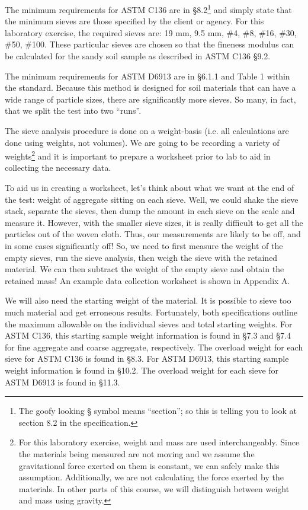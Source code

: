 \documentclass[12pt]{article}
\begin{document}
The minimum requirements for ASTM C136 are in \S8.2\footnote{The goofy looking \S{} symbol means ``section''; so this is telling you to look at section 8.2 in the specification.} and simply state that the minimum sieves are those specified by the client or agency. For this laboratory exercise, the required sieves are: 19 mm, 9.5 mm, \#4, \#8, \#16, \#30, \#50, \#100. These particular sieves are chosen so that the fineness modulus can be calculated for the sandy soil sample as described in ASTM C136 \S9.2.

The minimum requirements for ASTM D6913 are in \S6.1.1 and Table 1 within the standard. Because this method is designed for soil materials that can have a wide range of particle sizes, there are significantly more sieves. So many, in fact, that we split the test into two ``runs''.

The sieve analysis procedure is done on a weight-basis (i.e. all calculations are done using weights, not volumes). We are going to be recording a variety of weights\footnote{For this laboratory exercise, weight and mass are used interchangeably. Since the materials being measured are not moving and we assume the gravitational force exerted on them is constant, we can safely make this assumption. Additionally, we are not calculating the force exerted by the materials. In other parts of this course, we will distinguish between weight and mass using gravity.} and it is important to prepare a worksheet prior to lab to aid in collecting the necessary data.

To aid us in creating a worksheet, let's think about what we want at the end of the test: weight of aggregate sitting on each sieve. Well, we could shake the sieve stack, separate the sieves, then dump the amount in each sieve on the scale and measure it. However, with the smaller sieve sizes, it is really difficult to get all the particles out of the woven cloth. Thus, our measurements are likely to be off, and in some cases significantly off! So, we need to first measure the weight of the empty sieves, run the sieve analysis, then weigh the sieve with the retained material. We can then subtract the weight of the empty sieve and obtain the retained mass! An example data collection worksheet is shown in Appendix A.

We will also need the starting weight of the material. It is possible to sieve too much material and get erroneous results. Fortunately, both specifications outline the maximum allowable on the individual sieves and total starting weights. For ASTM C136, this starting sample weight information is found in \S7.3 and \S7.4 for fine aggregate and coarse aggregate, respectively. The overload weight for each sieve for ASTM C136 is found in \S8.3. For ASTM D6913, this starting sample weight information is found in \S10.2. The overload weight for each sieve for ASTM D6913 is found in \S11.3.
\end{document}
